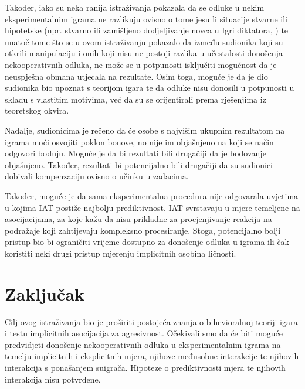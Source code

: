 \documentclass[a4paper, 12pt]{report}
\begin{document}
Također, iako su neka ranija istraživanja pokazala da se
odluke u nekim eksperimentalnim igrama ne razlikuju ovisno o tome jesu li
situacije stvarne ili hipotetske (npr. stvarno ili zamišljeno dodjeljivanje
novca u Igri diktatora, \citealp{ben2008economic}) te unatoč tome što se
u ovom istraživanju pokazalo da između sudionika koji su otkrili manipulaciju i
onih koji nisu ne postoji razlika u učestalosti donošenja nekooperativnih
odluka, ne može se u potpunosti isključiti mogućnost da je neuspješna obmana
utjecala na rezultate. Osim toga, moguće je da je dio sudionika bio upoznat s
teorijom igara te da odluke nisu donosili u potpunosti u skladu s vlastitim
motivima, već da su se orijentirali prema rješenjima iz teoretskog okvira. 

Nadalje, sudionicima je rečeno da će osobe s najvišim ukupnim rezultatom na
igrama moći osvojiti poklon bonove, no nije im objašnjeno na koji se način
odgovori boduju. Moguće je da bi rezultati bili drugačiji da je bodovanje
objašnjeno. Također, rezultati bi potencijalno bili drugačiji da su sudionici
dobivali kompenzaciju ovisno o učinku u zadacima.

Također, moguće je da sama eksperimentalna procedura nije odgovarala uvjetima u
kojima IAT postiže najbolju prediktivnost. \citet{uhlmann2012getting} IAT
svrstavaju u mjere temeljene na asocijacijama, za koje kažu da nisu prikladne za
procjenjivanje reakcija na podražaje koji zahtijevaju kompleksno procesiranje.
Stoga, potencijalno bolji pristup bio bi ograničiti vrijeme dostupno za
donošenje odluka u igrama ili čak koristiti neki drugi pristup mjerenju
implicitnih osobina ličnosti.

\section{Zaključak}

Cilj ovog istraživanja bio je proširiti postojeća znanja o bihevioralnoj teoriji
igara i testu implicitnih asocijacija za agresivnost. Očekivali smo da će biti
moguće predvidjeti donošenje nekooperativnih odluka u eksperimentalnim igrama na
temelju implicitnih i eksplicitnih mjera, njihove međusobne interakcije te
njihovih interakcija s ponašanjem suigrača. Hipoteze o prediktivnosti mjera te
njihovih interakcija nisu potvrđene. 
\end{document}
